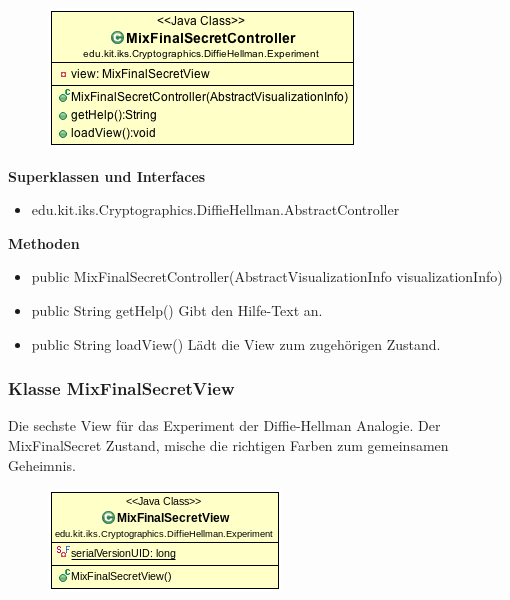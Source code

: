 \documentclass{article}
\begin{document}
      \begin{figure}[H]
        \centering
        \includegraphics{resources/edu-kit-iks-Cryptographics-DiffieHellman-Experiment-MixFinalSecretController}
      \end{figure}

      \textbf{Superklassen und Interfaces}
      \begin{itemize}
        \item edu.kit.iks.Cryptographics.DiffieHellman.AbstractController
      \end{itemize}

      \textbf{Methoden}
      \begin{itemize}
          \item public MixFinalSecretController(AbstractVisualizationInfo visualizationInfo)
        \item public String getHelp() \newline
        Gibt den Hilfe-Text an.
        \item public String loadView() \newline
        Lädt die View zum zugehörigen Zustand.
      \end{itemize}

\subsubsection{Klasse MixFinalSecretView}
      Die sechste View für das Experiment der Diffie-Hellman Analogie.
      Der MixFinalSecret Zustand, mische die richtigen Farben
      zum gemeinsamen Geheimnis.

      \begin{figure}[H]
        \centering
        \includegraphics{resources/edu-kit-iks-Cryptographics-DiffieHellman-Experiment-MixFinalSecretView}
      \end{figure}
\end{document}
